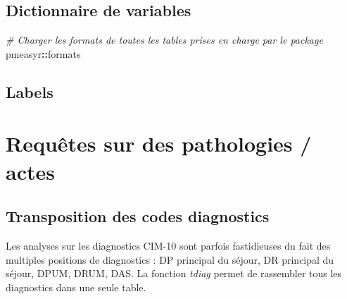 \documentclass[]{book}
\newenvironment{Shaded}{\begin{snugshade}}{\end{snugshade}}
\newcommand{\KeywordTok}[1]{\textcolor[rgb]{0.13,0.29,0.53}{\textbf{#1}}}
\newcommand{\DataTypeTok}[1]{\textcolor[rgb]{0.13,0.29,0.53}{#1}}
\newcommand{\CommentTok}[1]{\textcolor[rgb]{0.56,0.35,0.01}{\textit{#1}}}
\newcommand{\OperatorTok}[1]{\textcolor[rgb]{0.81,0.36,0.00}{\textbf{#1}}}
\newcommand{\NormalTok}[1]{#1}
\theoremstyle{definition}
\theoremstyle{definition}
\theoremstyle{definition}
\theoremstyle{remark}
\begin{document}
\section{Dictionnaire de variables}\label{dictionnaire-de-variables}

\begin{Shaded}
\end{Shaded}

\begin{Shaded}
\begin{Highlighting}[]
\CommentTok{# Charger les formats de toutes les tables prises en charge par le package}
\NormalTok{pmeasyr}\OperatorTok{::}\NormalTok{formats}
\end{Highlighting}
\end{Shaded}

\section{Labels}\label{labels}

\begin{Shaded}
\end{Shaded}

\chapter{Requêtes sur des pathologies /
actes}\label{requetes-sur-des-pathologies-actes}

\section{Transposition des codes
diagnostics}\label{transposition-des-codes-diagnostics}

Les analyses sur les diagnostics CIM-10 sont parfois fastidieuses du
fait des multiples positions de diagnostics : DP principal du séjour, DR
principal du séjour, DPUM, DRUM, DAS. La fonction \emph{tdiag} permet de
rassembler tous les diagnostics dans une seule table.
\end{document}
